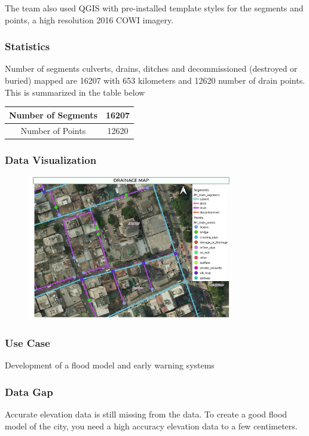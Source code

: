 \documentclass[a4paper,12pt,twoside]{article}
\begin{document}
The team also used QGIS with pre-installed template styles for the segments and points, a high resolution 2016 COWI imagery.


\subsubsection{Statistics}
Number of segments culverts, drains, ditches and decommissioned (destroyed or buried) mapped are 16207 with 653 kilometers and 12620 number of drain points.
This is summarized in the table below

\begin{center}
\begin{tabular}{|c|c|}
\hline
   Number of Segments & 16207 \\
\hline
   Number of Points & 12620 \\
   \hline
\end{tabular}
\end{center}

\subsubsection{Data Visualization}
\begin{figure}[h]
  \centering
  \includegraphics[width=0.8\textwidth]{images/Drainage_Visualization.jpeg}
\end{figure}

\subsubsection{Use Case}
Development of a flood model and early warning systems

\subsubsection{Data Gap}
Accurate elevation data is still missing from the data. To create a good flood model of the city, you need a high accuracy elevation data to a few centimeters.
\end{document}
